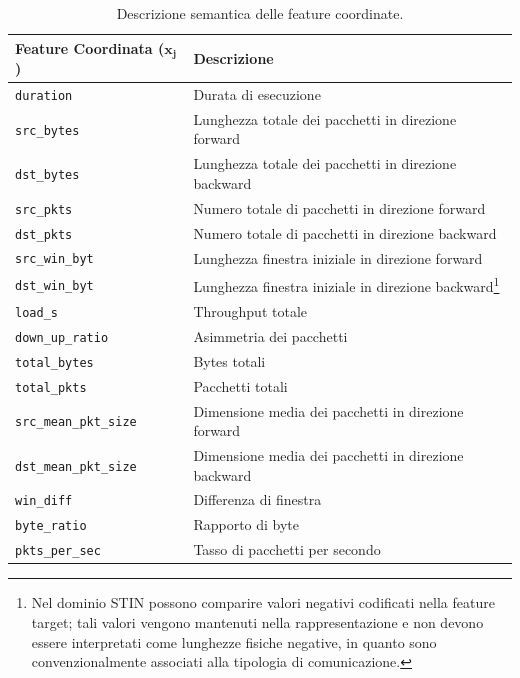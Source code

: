 \begin{table}[H]
    \centering
    \small
    \caption{Descrizione semantica delle feature coordinate.}
    \label{tab:feature_descriptions}
    \begin{tabularx}{\textwidth}{l >{\raggedright\arraybackslash}X}
        \toprule
        \textbf{Feature Coordinata ($\mathbf{x_j}$)} & \textbf{Descrizione} \\
        \midrule
        \texttt{duration} & Durata di esecuzione \\
        \texttt{src\_bytes} & Lunghezza totale dei pacchetti in direzione forward \\
        \texttt{dst\_bytes} & Lunghezza totale dei pacchetti in direzione backward \\
        \texttt{src\_pkts} & Numero totale di pacchetti in direzione forward \\
        \texttt{dst\_pkts} & Numero totale di pacchetti in direzione backward \\
        \texttt{src\_win\_byt} & Lunghezza finestra iniziale in direzione forward \\
        \texttt{dst\_win\_byt} & Lunghezza finestra iniziale in direzione backward\footnote{Nel dominio STIN possono comparire valori negativi codificati nella feature target; tali valori vengono mantenuti nella rappresentazione e non devono essere interpretati come lunghezze fisiche negative, in quanto sono convenzionalmente associati alla tipologia di comunicazione.} \\
        \texttt{load\_s} & Throughput totale \\
        \texttt{down\_up\_ratio} & Asimmetria dei pacchetti \\
        \texttt{total\_bytes} & Bytes totali \\
        \texttt{total\_pkts} & Pacchetti totali \\
        \texttt{src\_mean\_pkt\_size} & Dimensione media dei pacchetti in direzione forward \\
        \texttt{dst\_mean\_pkt\_size} & Dimensione media dei pacchetti in direzione backward \\
        \texttt{win\_diff} & Differenza di finestra \\
        \texttt{byte\_ratio} & Rapporto di byte \\
        \texttt{pkts\_per\_sec} & Tasso di pacchetti per secondo \\
        \bottomrule
    \end{tabularx}
\end{table}

